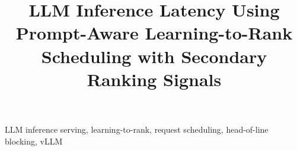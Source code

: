 \documentclass[conference]{IEEEtran}
\begin{document}
\title{\selectfont LLM Inference Latency Using Prompt-Aware Learning-to-Rank Scheduling with Secondary Ranking Signals}

\author{
\and
{}
}

\maketitle



\begin{IEEEkeywords}
LLM inference serving, learning-to-rank, request scheduling, head-of-line blocking, vLLM
\end{IEEEkeywords}

\clearpage


\clearpage


\clearpage


\clearpage


\clearpage


\clearpage


\clearpage


\clearpage


\clearpage
\label{sec:references}


\end{document}
